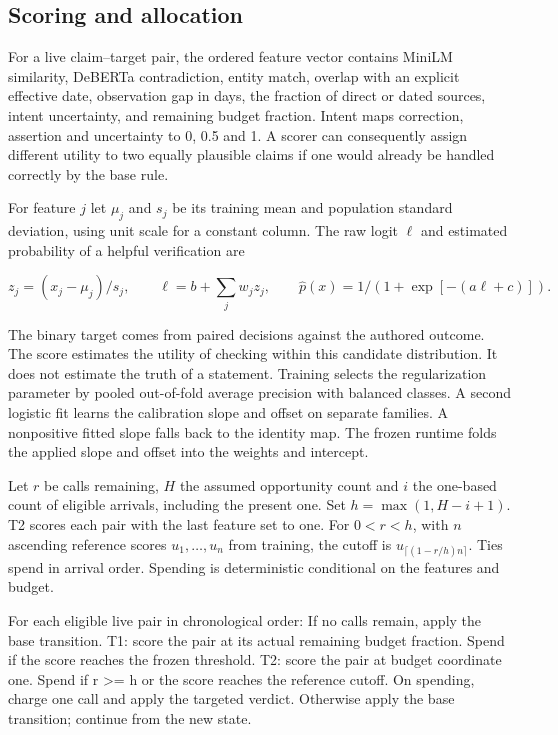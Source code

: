 \documentclass[
  11pt,
]{article}
\newenvironment{Shaded}{}{}
\newcommand{\NormalTok}[1]{#1}
\begin{document}
\subsection{Scoring and allocation}\label{scoring-and-allocation}

For a live claim--target pair, the ordered feature vector contains
MiniLM similarity, DeBERTa contradiction, entity match, overlap with an
explicit effective date, observation gap in days, the fraction of direct
or dated sources, intent uncertainty, and remaining budget fraction.
Intent maps correction, assertion and uncertainty to 0, 0.5 and 1. A
scorer can consequently assign different utility to two equally
plausible claims if one would already be handled correctly by the base
rule.

For feature \(j\) let \(\mu_j\) and \(s_j\) be its training mean and
population standard deviation, using unit scale for a constant column.
The raw logit \(\ell\) and estimated probability of a helpful
verification are

\[
z_j=(x_j-\mu_j)/s_j,\qquad
\ell=b+\sum_j w_j z_j,\qquad
\hat p(x)=1/(1+\exp[-(a\ell+c)]).
\]

The binary target comes from paired decisions against the authored
outcome. The score estimates the utility of checking within this
candidate distribution. It does not estimate the truth of a statement.
Training selects the regularization parameter by pooled out-of-fold
average precision with balanced classes. A second logistic fit learns
the calibration slope and offset on separate families. A nonpositive
fitted slope falls back to the identity map. The frozen runtime folds
the applied slope and offset into the weights and intercept.

Let \(r\) be calls remaining, \(H\) the assumed opportunity count and
\(i\) the one-based count of eligible arrivals, including the present
one. Set \(h=\max(1,H-i+1)\). T2 scores each pair with the last feature
set to one. For \(0<r<h\), with \(n\) ascending reference scores
\(u_1,\ldots,u_n\) from training, the cutoff is
\(u_{\lceil(1-r/h)n\rceil}\). Ties spend in arrival order. Spending is
deterministic conditional on the features and budget.

\begin{samepage}\begin{Shaded}
\begin{Highlighting}[]
\NormalTok{For each eligible live pair in chronological order:}
\NormalTok{    If no calls remain, apply the base transition.}
\NormalTok{    T1: score the pair at its actual remaining budget fraction.}
\NormalTok{        Spend if the score reaches the frozen threshold.}
\NormalTok{    T2: score the pair at budget coordinate one.}
\NormalTok{        Spend if r \textgreater{}= h or the score reaches the reference cutoff.}
\NormalTok{    On spending, charge one call and apply the targeted verdict.}
\NormalTok{    Otherwise apply the base transition; continue from the new state.}
\end{Highlighting}
\end{Shaded}\end{samepage}
\end{document}
